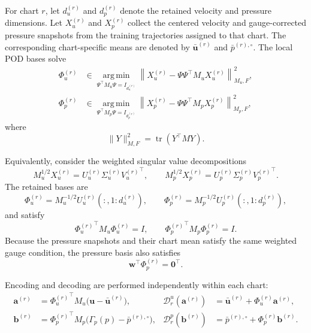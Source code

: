 \documentclass{article}
\begin{document}
For chart $r$, let $d_u^{(r)}$ and $d_p^{(r)}$ denote the retained velocity
and pressure dimensions.
Let $X_u^{(r)}$ and $X_p^{(r)}$ collect the centered velocity and
gauge-corrected pressure snapshots from the training trajectories assigned
to that chart.
The corresponding chart-specific means are denoted by
$\bar{\bm u}^{(r)}$ and $\bar p^{(r),\circ}$.
The local POD bases solve
\begin{align}
    \Phi_u^{(r)}
    &\in
    \underset{\Psi^\top M_u\Psi=I_{d_u^{(r)}}}
    {\operatorname{arg\,min}}
    \left\|
        X_u^{(r)}
        -\Psi\Psi^\top M_uX_u^{(r)}
    \right\|_{M_u,F}^2,
    \\
    \Phi_p^{(r)}
    &\in
    \underset{\Psi^\top M_p\Psi=I_{d_p^{(r)}}}
    {\operatorname{arg\,min}}
    \left\|
        X_p^{(r)}
        -\Psi\Psi^\top M_pX_p^{(r)}
    \right\|_{M_p,F}^2,
    \label{eq:app_pod_optimization}
\end{align}
where
\begin{equation}
    \|Y\|_{M,F}^2=\operatorname{tr}(Y^\top MY).
\end{equation}

Equivalently, consider the weighted singular value decompositions
\begin{equation}
    M_u^{1/2}X_u^{(r)}
    =
    U_u^{(r)}\Sigma_u^{(r)}{V_u^{(r)}}^\top,
    \qquad
    M_p^{1/2}X_p^{(r)}
    =
    U_p^{(r)}\Sigma_p^{(r)}{V_p^{(r)}}^\top.
\end{equation}
The retained bases are
\begin{equation}
    \Phi_u^{(r)}
    =
    M_u^{-1/2}
    U_u^{(r)}(:,1{:}d_u^{(r)}),
    \qquad
    \Phi_p^{(r)}
    =
    M_p^{-1/2}
    U_p^{(r)}(:,1{:}d_p^{(r)}),
    \label{eq:app_weighted_svd_bases}
\end{equation}
and satisfy
\begin{equation}
    {\Phi_u^{(r)}}^\top M_u\Phi_u^{(r)}=I,
    \qquad
    {\Phi_p^{(r)}}^\top M_p\Phi_p^{(r)}=I.
\end{equation}
Because the pressure snapshots and their chart mean satisfy the same weighted
gauge condition, the pressure basis also satisfies
\begin{equation}
    \bm w^\top\Phi_p^{(r)}=\bm 0^\top .
\end{equation}

Encoding and decoding are performed independently within each chart:
\begin{align}
    \bm a^{(r)}
    &=
    {\Phi_u^{(r)}}^\top
    M_u
    \bigl(\bm u-\bar{\bm u}^{(r)}\bigr),
    &
    \mathcal D_r^u(\bm a^{(r)})
    &=
    \bar{\bm u}^{(r)}
    +\Phi_u^{(r)}\bm a^{(r)},
    \\
    \bm b^{(r)}
    &=
    {\Phi_p^{(r)}}^\top
    M_p
    \bigl(\Gamma_p(p)-\bar p^{(r),\circ}\bigr),
    &
    \mathcal D_r^p(\bm b^{(r)})
    &=
    \bar p^{(r),\circ}
    +\Phi_p^{(r)}\bm b^{(r)}.
    \label{eq:app_encode_decode}
\end{align}
\end{document}
